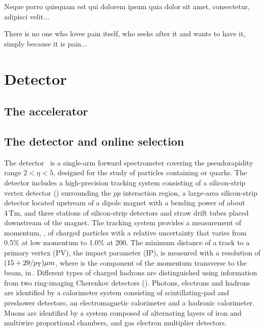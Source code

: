 \begin{savequote}[8cm]
\textlatin{Neque porro quisquam est qui dolorem ipsum quia dolor sit amet, consectetur, adipisci velit...}

There is no one who loves pain itself, who seeks after it and wants to have it, simply because it is pain...
\end{savequote}

\chapter{\label{ch:3-detector}Detector} 

\minitoc

\section{The \lhc accelerator}

\section{The \lhcb detector and online selection}
\label{sec:detector}

The \lhcb detector~\cite{Alves:2008zz,LHCb-DP-2014-002} is a single-arm forward spectrometer covering the \mbox{pseudorapidity} range $2<\eta <5$, designed for the study of particles containing \bquark or \cquark quarks. The detector includes a high-precision tracking system consisting of a silicon-strip vertex detector (\velo) surrounding the $pp$ interaction region, a large-area silicon-strip detector located upstream of a dipole magnet with a bending power of about $4{\mathrm{\,Tm}}$, and three stations of silicon-strip detectors and straw drift tubes placed downstream of the magnet. The tracking system provides a measurement of momentum, \ptot, of charged particles with a relative uncertainty that varies from 0.5\% at low momentum to 1.0\% at 200\gevc. The minimum distance of a track to a primary vertex (PV), the impact parameter (IP), is measured with a resolution of $(15+29/\mbox{$p_{\mathrm{ T}}$})\mu m$, where \pt is the component of the momentum transverse to the beam, in\,\gevc. Different types of charged hadrons are distinguished using information from two ring-imaging Cherenkov detectors (\rich). Photons, electrons and hadrons are identified by a calorimeter system consisting of scintillating-pad and preshower detectors, an electromagnetic calorimeter and a hadronic calorimeter. Muons are identified by a system composed of alternating layers of iron and multiwire proportional chambers, and gas electron multiplier detectors. 

